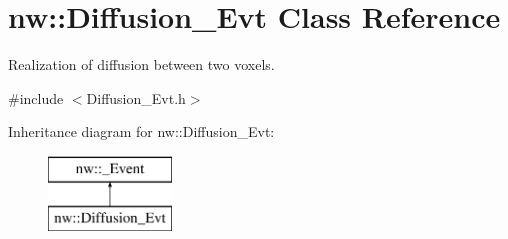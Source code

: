 \hypertarget{classnw_1_1_diffusion___evt}{\section{nw\+:\+:Diffusion\+\_\+\+Evt Class Reference}
\label{classnw_1_1_diffusion___evt}
}


Realization of diffusion between two voxels.  




{\ttfamily \#include $<$Diffusion\+\_\+\+Evt.\+h$>$}

Inheritance diagram for nw\+:\+:Diffusion\+\_\+\+Evt\+:\begin{figure}[H]
\begin{center}
\leavevmode
\includegraphics[height=2.000000cm]{db/d40/classnw_1_1_diffusion___evt}
\end{center}
\end{figure}
